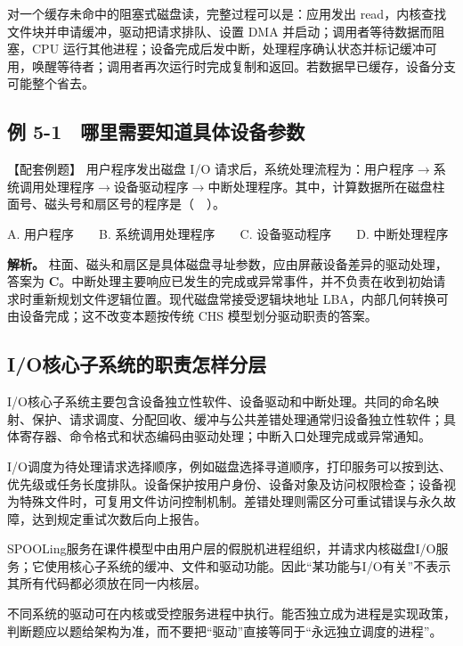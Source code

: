 对一个缓存未命中的阻塞式磁盘读，完整过程可以是：应用发出 read，内核查找文件块并申请缓冲，驱动把请求排队、设置 DMA 并启动；调用者等待数据而阻塞，CPU 运行其他进程；设备完成后发中断，处理程序确认状态并标记缓冲可用，唤醒等待者；调用者再次运行时完成复制和返回。若数据早已缓存，设备分支可能整个省去。

\subsection{例 5-1　哪里需要知道具体设备参数}\label{OS05-ex7-1}

\begin{example}[配套例题]

【配套例题】 用户程序发出磁盘 I/O 请求后，系统处理流程为：用户程序\ensuremath{\to}系统调用处理程序\ensuremath{\to}设备驱动程序\ensuremath{\to}中断处理程序。其中，计算数据所在磁盘柱面号、磁头号和扇区号的程序是（　）。

A. 用户程序　　B. 系统调用处理程序　　C. 设备驱动程序　　D. 中断处理程序

\end{example}

\textbf{解析。} 柱面、磁头和扇区是具体磁盘寻址参数，应由屏蔽设备差异的驱动处理，答案为 \textbf{C}。中断处理主要响应已发生的完成或异常事件，并不负责在收到初始请求时重新规划文件逻辑位置。现代磁盘常接受逻辑块地址 LBA，内部几何转换可由设备完成；这不改变本题按传统 CHS 模型划分驱动职责的答案。

\subsection{I/O核心子系统的职责怎样分层}\label{OS05-core-functions}

I/O核心子系统主要包含设备独立性软件、设备驱动和中断处理。共同的命名映射、保护、请求调度、分配回收、缓冲与公共差错处理通常归设备独立性软件；具体寄存器、命令格式和状态编码由驱动处理；中断入口处理完成或异常通知。

I/O调度为待处理请求选择顺序，例如磁盘选择寻道顺序，打印服务可以按到达、优先级或任务长度排队。设备保护按用户身份、设备对象及访问权限检查；设备视为特殊文件时，可复用文件访问控制机制。差错处理则需区分可重试错误与永久故障，达到规定重试次数后向上报告。

SPOOLing服务在课件模型中由用户层的假脱机进程组织，并请求内核磁盘I/O服务；它使用核心子系统的缓冲、文件和驱动功能。因此``某功能与I/O有关''不表示其所有代码都必须放在同一内核层。

不同系统的驱动可在内核或受控服务进程中执行。能否独立成为进程是实现政策，判断题应以题给架构为准，而不要把``驱动''直接等同于``永远独立调度的进程''。

